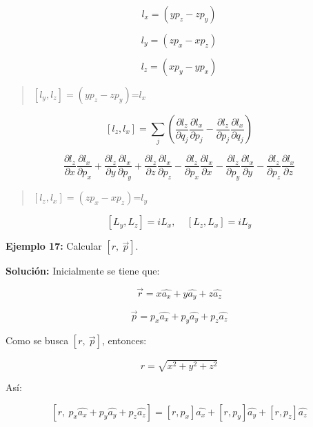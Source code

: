 \documentclass[]{article}
\begin{document}
\[l_{x} = \left( yp_{z} - zp_{y} \right)\]

\[l_{y} = \left( zp_{x} - xp_{z} \right)\]

\[l_{z} = \left( xp_{y} - yp_{x} \right)\]

\begin{quote}
\(\left\lbrack l_{y},l_{z} \right\rbrack = \left( yp_{z} - zp_{y} \right)\)=\(l_{x}\)
\end{quote}

\[\left\lbrack l_{z},l_{x} \right\rbrack = \sum_{j}^{}\left( \frac{\partial l_{z}}{\partial q_{j}}\frac{\partial l_{x}}{\partial p_{j}} - \frac{\partial l_{z}}{\partial p_{j}}\frac{\partial l_{x}}{\partial q_{j}} \right)\]

\[\frac{\partial l_{z}}{\partial x}\frac{\partial l_{x}}{\partial p_{x}} + \frac{\partial l_{z}}{\partial y}\frac{\partial l_{x}}{\partial p_{y}} + \frac{\partial l_{z}}{\partial z}\frac{\partial l_{x}}{\partial p_{z}} - \frac{\partial l_{z}}{\partial p_{x}}\frac{\partial l_{x}}{\partial x} - \frac{\partial l_{z}}{\partial p_{y}}\frac{\partial l_{x}}{\partial y} - \frac{\partial l_{z}}{\partial p_{z}}\frac{\partial l_{x}}{\partial z}\]

\begin{quote}
\(\left\lbrack l_{z},l_{x} \right\rbrack = \left( zp_{x} - xp_{z} \right)\)=\(l_{y}\)
\end{quote}

\[\left\lbrack L_{y},L_{z} \right\rbrack = {iL}_{x},\ \ \ \ \ \left\lbrack L_{z},L_{x} \right\rbrack = {iL}_{y}\]

\textbf{Ejemplo 17:} Calcular
\(\left\lbrack r,\ \overrightarrow{p} \right\rbrack\).

\textbf{Solución:} Inicialmente se tiene que:

\[\overrightarrow{r} = x\widehat{a_{x}} + y\widehat{a_{y}} + z\widehat{a_{z}}\]

\[\overrightarrow{p} = p_{x}\widehat{a_{x}} + p_{y}\widehat{a_{y}} + p_{z}\widehat{a_{z}}\]

Como se busca \(\left\lbrack r,\ \overrightarrow{p} \right\rbrack\),
entonces:

\[r = \sqrt{x^{2} + y^{2} + z^{2}}\]

Así:

\[\left\lbrack r,\ p_{x}\widehat{a_{x}} + p_{y}\widehat{a_{y}} + p_{z}\widehat{a_{z}} \right\rbrack = \left\lbrack r,p_{x} \right\rbrack\widehat{a_{x}} + \left\lbrack r,p_{y} \right\rbrack\widehat{a_{y}} + \left\lbrack r,p_{z} \right\rbrack\widehat{a_{z}}\]
\end{document}
